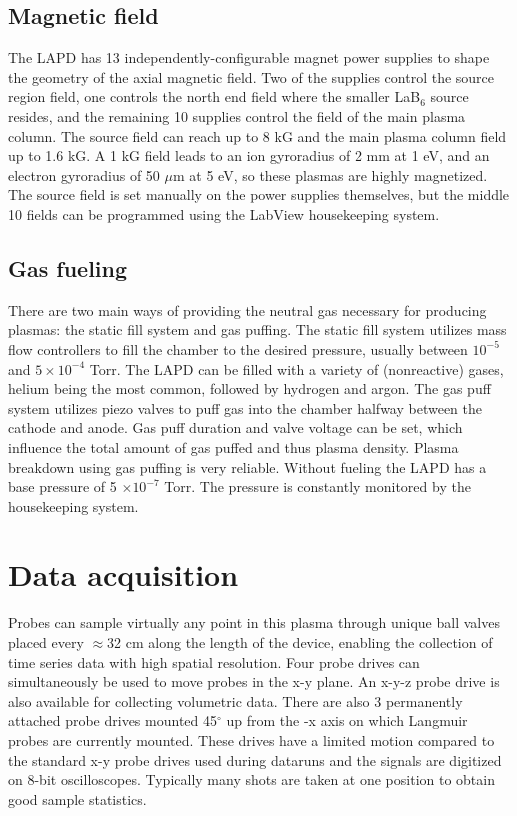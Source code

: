 \subsection{Magnetic field}
The LAPD has 13 independently-configurable magnet power supplies to shape the geometry of the axial magnetic field. Two of the supplies control the source region field, one controls the north end field where the smaller LaB$_6$ source resides, and the remaining 10 supplies control the field of the main plasma column. The source field can reach up to 8 kG and the main plasma column field up to 1.6 kG. A 1 kG field leads to an ion gyroradius of 2 mm at 1 eV, and an electron gyroradius of 50 $\mu$m at 5 eV, so these plasmas are highly magnetized. The source field is set manually on the power supplies themselves, but the middle 10 fields can be programmed using the LabView housekeeping system.

\subsection{Gas fueling}
There are two main ways of providing the neutral gas necessary for producing plasmas: the static fill system and gas puffing. The static fill system utilizes mass flow controllers to fill the chamber to the desired pressure, usually between $10^{-5}$ and $5 \times 10^{-4}$ Torr. The LAPD can be filled with a variety of (nonreactive) gases, helium being the most common, followed by hydrogen and argon. The gas puff system utilizes piezo valves to puff gas into the chamber halfway between the cathode and anode. Gas puff duration and valve voltage can be set, which influence the total amount of gas puffed and thus plasma density. Plasma  breakdown using gas puffing is very reliable. Without fueling the LAPD has a base pressure of 5 $\times 10^{-7}$ Torr. The pressure is constantly monitored by the housekeeping system. 

\section{Data acquisition}

Probes can sample virtually any point in this plasma through unique ball valves placed every $\approx$32 cm along the length of the device, enabling the collection of time series data with high spatial resolution. Four probe drives can simultaneously be used to move probes in the x-y plane. An x-y-z probe drive is also available for collecting volumetric data. There are also 3 permanently attached probe drives mounted 45$^\circ$ up from the -x axis on which Langmuir probes are currently mounted. These drives have a limited motion compared to the standard x-y probe drives used during dataruns and the signals are digitized on 8-bit oscilloscopes. Typically many shots are taken at one position to obtain good sample statistics.

